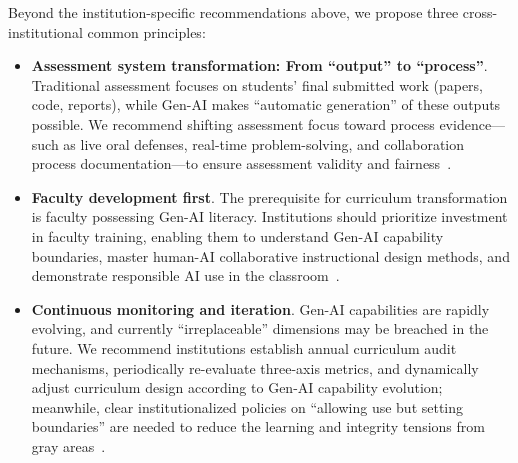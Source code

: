 Beyond the institution-specific recommendations above, we propose three cross-institutional common principles:
\begin{itemize}
    \item \textbf{Assessment system transformation: From ``output'' to ``process''}. Traditional assessment focuses on students' final submitted work (papers, code, reports), while Gen-AI makes ``automatic generation'' of these outputs possible. We recommend shifting assessment focus toward process evidence---such as live oral defenses, real-time problem-solving, and collaboration process documentation---to ensure assessment validity and fairness~\citep{harris2024processoverproduct}.
    \item \textbf{Faculty development first}. The prerequisite for curriculum transformation is faculty possessing Gen-AI literacy. Institutions should prioritize investment in faculty training, enabling them to understand Gen-AI capability boundaries, master human-AI collaborative instructional design methods, and demonstrate responsible AI use in the classroom~\citep{jogezai2025generativeartifici}.
    \item \textbf{Continuous monitoring and iteration}. Gen-AI capabilities are rapidly evolving, and currently ``irreplaceable'' dimensions may be breached in the future. We recommend institutions establish annual curriculum audit mechanisms, periodically re-evaluate three-axis metrics, and dynamically adjust curriculum design according to Gen-AI capability evolution; meanwhile, clear institutionalized policies on ``allowing use but setting boundaries'' are needed to reduce the learning and integrity tensions from gray areas~\citep{hamerman2024aninvestigationofg,hashemi2025navigatingthedoubl}.
\end{itemize}

